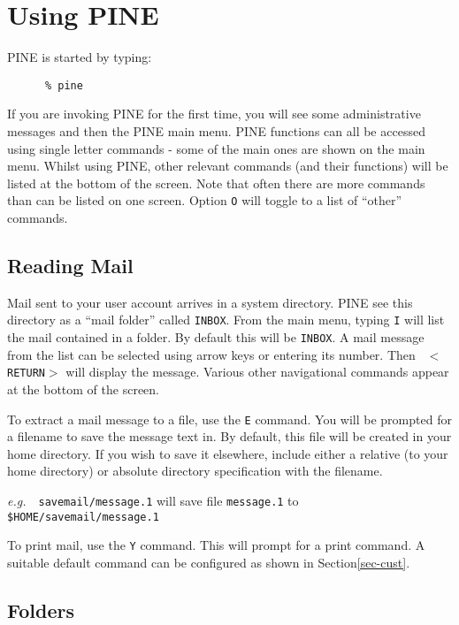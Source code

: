 \section{Using PINE}

PINE is started by typing:

\begin{verbatim}
      % pine
\end{verbatim}

If you are invoking PINE for the first time, you will see some
administrative messages and then the PINE main menu. PINE functions
can all be accessed using single letter commands - some of the main
ones are shown on the main menu. Whilst using PINE, other relevant commands
(and their functions) will be listed at the bottom of the screen.
Note that often there are more commands than can be listed on one screen.
Option {\tt O} will toggle to a list of ``other'' commands.

\subsection{Reading Mail}

Mail sent to your user account arrives in a system directory. PINE
see this directory as a ``mail folder'' called {\tt INBOX}. From the
main menu, typing {\tt I} will list the mail contained in a folder.
By default this will be {\tt INBOX}. A mail message from the list
can be selected using arrow keys or entering its number. Then {\tt
$<$RETURN$>$} will display the message. Various other navigational commands
appear at the bottom of the screen.

To extract a mail message to a file, use the {\tt E} command. You will be
prompted for a filename to save the message text in. By default, this
file will be created in your home directory. If you wish to save it
elsewhere, include either a relative (to your home directory)
or absolute directory specification with the filename.

{\em e.g.}~~{\tt savemail/message.1} will save file {\tt message.1} to
{\tt \$HOME/savemail/message.1}

To print mail, use the {\tt Y} command. This will prompt for
a print command. A suitable default command can be configured as
shown in Section\ref{sec-cust}.

\subsection{Folders}


